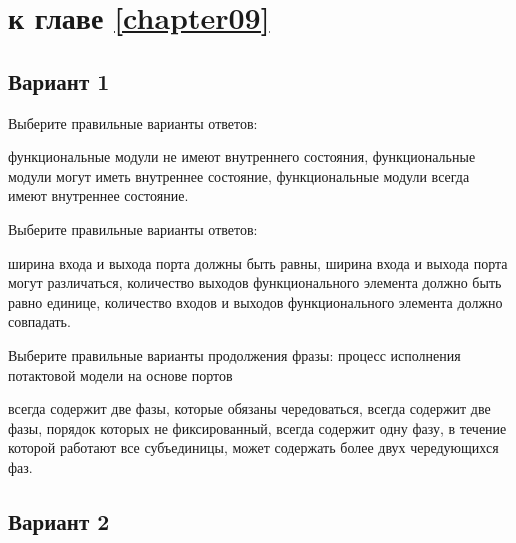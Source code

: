 \section{\Questions к главе \ref{chapter09}} %

\subsection*{Вариант 1}

\begin{questions}

\question[3] Выберите правильные варианты ответов:
\begin{choices}
    \correctchoice функциональные модули не имеют внутреннего состояния,
    \choice функциональные модули могут иметь внутреннее состояние,
    \choice функциональные модули всегда имеют внутреннее состояние.
\end{choices}
    
    
\question[3] Выберите правильные варианты ответов:
\begin{choices}
    \correctchoice ширина входа и выхода порта должны быть равны,
    \choice ширина входа и выхода порта могут различаться,
    \choice количество выходов функционального элемента должно быть равно единице,
    \choice количество входов и выходов функционального элемента должно совпадать.
\end{choices}
    
\question[3] Выберите правильные варианты продолжения фразы: процесс исполнения потактовой модели на основе портов 
\begin{choices}
    \correctchoice всегда содержит две фазы, которые обязаны чередоваться,
    \choice всегда содержит две фазы, порядок которых не фиксированный,
    \choice всегда содержит одну фазу, в течение которой работают все субъединицы,
    \choice может содержать более двух чередующихся фаз.
\end{choices}


\end{questions}

\subsection*{Вариант 2}

